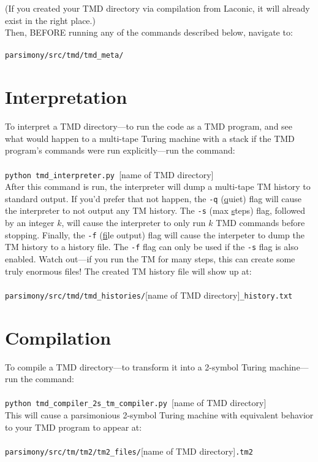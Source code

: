 \documentclass[11pt]{article}
\begin{document}
(If you created your TMD directory via compilation from Laconic, it will already exist in the right place.) \\

Then, BEFORE running any of the commands described below, navigate to: \\ \\
\texttt{parsimony/src/tmd/tmd_meta/}

\section{Interpretation}

To interpret a TMD directory---to run the code as a TMD program, and see what would happen to a multi-tape Turing machine with a stack if the TMD program's commands were run explicitly---run the command: \\ \\ 
\texttt{python tmd_interpreter.py }[name of TMD directory] \\

After this command is run, the interpreter will dump a multi-tape TM history to standard output. If you'd prefer that not happen, the \texttt{-q} (\underline{q}uiet) flag will cause the interpreter to not output any TM history. The \texttt{-s} (max \underline{s}teps) flag, followed by an integer $k$, will cause the interpreter to only run $k$ TMD commands before stopping. Finally, the \texttt{-f} (\underline{f}ile output) flag will cause the interpeter to dump the TM history to a history file. The \texttt{-f} flag can only be used if the \texttt{-s} flag is also enabled. Watch out---if you run the TM for many steps, this can create some truly enormous files! The created TM history file will show up at: \\ \\
\texttt{parsimony/src/tmd/tmd_histories/}[name of TMD directory]\texttt{_history.txt}

\section{Compilation}

To compile a TMD directory---to transform it into a 2-symbol Turing machine---run the command: \\ \\
\texttt{python tmd_compiler_2s_tm_compiler.py }[name of TMD directory] \\

This will cause a parsimonious 2-symbol Turing machine with equivalent behavior to your TMD program to appear at: \\ \\
\texttt{parsimony/src/tm/tm2/tm2_files/}[name of TMD directory]\texttt{.tm2}
\end{document}
